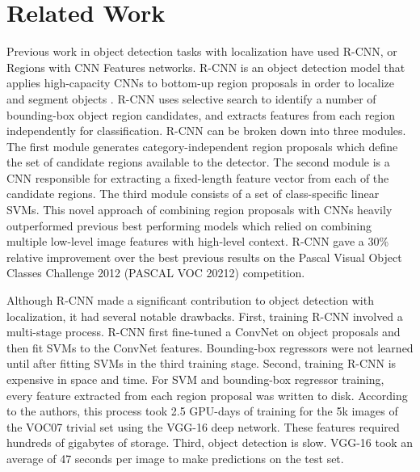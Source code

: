 \documentclass[conference]{IEEEtran}
\begin{document}
\section{Related Work} \label{related_work}
Previous work in object detection tasks with localization have used R-CNN, or Regions with CNN Features networks. R-CNN is an object detection model that applies high-capacity CNNs to bottom-up region proposals in order to localize and segment objects \cite{girshick2014rich}. R-CNN uses selective search to identify a number of bounding-box object region candidates, and extracts features from each region independently for classification. R-CNN can be broken down into three modules. The first module generates category-independent region proposals which define the set of candidate regions available to the detector. The second module is a CNN responsible for extracting a fixed-length feature vector from each of the candidate regions. The third module consists of a set of class-specific linear SVMs. This novel approach of combining region proposals with CNNs heavily outperformed previous best performing models which relied on combining multiple low-level image features with high-level context. R-CNN gave a 30\% relative improvement over the best previous results on the Pascal Visual Object Classes Challenge 2012 (PASCAL VOC 20212) competition. 

Although R-CNN made a significant contribution to object detection with localization, it had several notable drawbacks. First, training R-CNN involved a multi-stage process. R-CNN first fine-tuned a ConvNet on object proposals and then fit SVMs to the ConvNet features. Bounding-box regressors were not learned until after fitting SVMs in the third training stage. Second, training R-CNN is expensive in space and time. For SVM and bounding-box regressor training, every feature extracted from each region proposal was written to disk. According to the authors, this process took 2.5 GPU-days of training for the 5k images of the VOC07 trivial set using the VGG-16 deep network. These features required hundreds of gigabytes of storage. Third, object detection is slow. VGG-16 took an average of 47 seconds per image to make predictions on the test set. 
\end{document}
